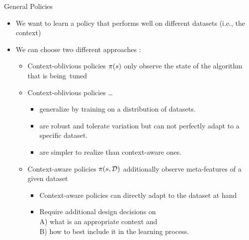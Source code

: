 \documentclass[main]{subfiles}
\begin{document}
\begin{frame}{General Policies}
    \begin{itemize}
        \item We want to learn a policy that performs well on different datasets (i.e., the context)\pause
        \item We can choose two different approaches :\pause
        \begin{itemize}
            \item Context-oblivious policies $\pi(s)$ only observe the state of the algorithm that is being~tuned
            \item Context-oblivious policies \ldots
            \begin{itemize}\pause
                \item generalize by training on a distribution of datasets.
                \item are robust and tolerate variation but can not perfectly adapt to a specific dataset.
                \item are simpler to realize than context-aware ones.
            \end{itemize}\pause
            \item Context-aware policies $\pi(s,\mathcal{D})$ additionally observe meta-features of a given dataset
            \begin{itemize}\pause
                \item Context-aware policies can directly adapt to the dataset at hand
                \item Require additional design decisions on\\A) what is an appropriate context and\\ B) how to best include it in the learning process.
            \end{itemize}
        \end{itemize}
    \end{itemize}
\end{frame}
\end{document}
